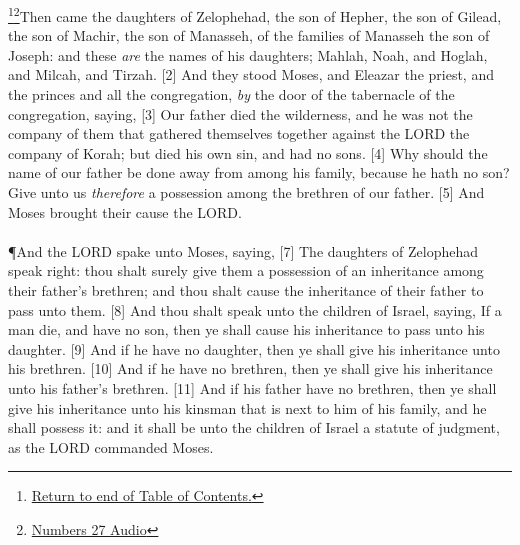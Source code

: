 \footnote{\textcolor[rgb]{0.00,0.25,0.00}{\hyperlink{TOC}{Return to end of Table of Contents.}}}\footnote{\href{https://audiobible.com/bible/numbers_27.html}{\textcolor[cmyk]{0.99998,1,0,0}{Numbers 27 Audio}}}\textcolor[cmyk]{0.99998,1,0,0}{Then came the daughters of Zelophehad, the son of Hepher, the son of Gilead, the son of Machir, the son of Manasseh, of the families of Manasseh the son of Joseph: and these \emph{are} the names of his daughters; Mahlah, Noah, and Hoglah, and Milcah, and Tirzah.}
[2] \textcolor[cmyk]{0.99998,1,0,0}{And they stood  Moses, and  Eleazar the priest, and  the princes and all the congregation, \emph{by} the door of the tabernacle of the congregation, saying,}
[3] \textcolor[cmyk]{0.99998,1,0,0}{Our father died  the wilderness, and he was not  the company of them that gathered themselves together against the LORD  the company of Korah; but died  his own sin, and had no sons.}
[4] \textcolor[cmyk]{0.99998,1,0,0}{Why should the name of our father be done away from among his family, because he hath no son? Give unto us \emph{therefore} a possession among the brethren of our father.}
[5] \textcolor[cmyk]{0.99998,1,0,0}{And Moses brought their cause  the LORD.}\\
\\
\P \textcolor[cmyk]{0.99998,1,0,0}{And the LORD spake unto Moses, saying,}
[7] \textcolor[cmyk]{0.99998,1,0,0}{The daughters of Zelophehad speak right: thou shalt surely give them a possession of an inheritance among their father's brethren; and thou shalt cause the inheritance of their father to pass unto them.}
[8] \textcolor[cmyk]{0.99998,1,0,0}{And thou shalt speak unto the children of Israel, saying, If a man die, and have no son, then ye shall cause his inheritance to pass unto his daughter.}
[9] \textcolor[cmyk]{0.99998,1,0,0}{And if he have no daughter, then ye shall give his inheritance unto his brethren.}
[10] \textcolor[cmyk]{0.99998,1,0,0}{And if he have no brethren, then ye shall give his inheritance unto his father's brethren.}
[11] \textcolor[cmyk]{0.99998,1,0,0}{And if his father have no brethren, then ye shall give his inheritance unto his kinsman that is next to him of his family, and he shall possess it: and it shall be unto the children of Israel a statute of judgment, as the LORD commanded Moses.}\\
